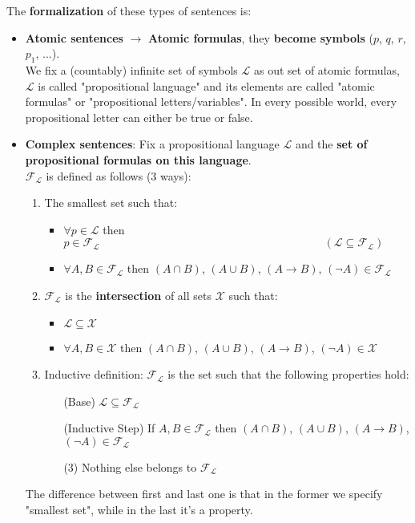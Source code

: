 	The \textbf{formalization} of these types of sentences is:
	\begin{itemize}
		\item \textbf{Atomic sentences} $\rightarrow$ \textbf{Atomic formulas}, they \textbf{become symbols} ($p$, $q$, $r$, $p_1$, ...).\\ We fix a (countably) infinite set of symbols $\mathcal{L}$ as out set of atomic formulas, $\mathcal{L}$ is called "propositional language" and its elements are called "atomic formulas" or "propositional letters/variables". In every possible world, every propositional letter can either be true or false. \\

		\item \textbf{Complex sentences}: Fix a propositional language $\mathcal{L}$ and the \textbf{set of propositional formulas on this language}.\\ $\mathcal{F}_\mathcal{L}$ is defined as follows (3 ways):
		\begin{enumerate}
			\item The smallest set such that:
			\begin{itemize}
				\item $\forall p \in \mathcal{L}$ then $p \in \mathcal{F}_\mathcal{L} \qquad\qquad\qquad\qquad\qquad\qquad\qquad\qquad\qquad\qquad (\mathcal{L} \subseteq \mathcal{F}_\mathcal{L})$
				\item $\forall A, B \in \mathcal{F}_\mathcal{L}$ then $(A \cap B)$, $(A \cup B)$, $(A \rightarrow B)$, $(\neg A) \in \mathcal{F}_\mathcal{L}$
			\end{itemize}

			\item $\mathcal{F}_\mathcal{L}$ is the \textbf{intersection} of all sets $\mathcal{X}$ such that:
			\begin{itemize}
				\item $\mathcal{L} \subseteq \mathcal{X}$
				\item $\forall A,B \in \mathcal{X}$ then $(A \cap B)$, $(A \cup B)$, $(A \rightarrow B)$, $(\neg A) \in \mathcal{X}$
			\end{itemize}

			\item Inductive definition: $\mathcal{F}_\mathcal{L}$ is the set such that the following properties hold:
			\begin{enumerate}[leftmargin=6em]
				\item[(Base)] $\mathcal{L} \subseteq \mathcal{F}_\mathcal{L}$
				\item[(Inductive Step)] If $A, B \in \mathcal{F}_\mathcal{L}$ then $(A \cap B)$, $(A \cup B)$, $(A \rightarrow B)$, $(\neg A) \in \mathcal{F}_\mathcal{L}$
				\item[(3)] Nothing else belongs to $\mathcal{F}_\mathcal{L}$
			\end{enumerate}
		\end{enumerate}

		The difference between first and last one is that in the former we specify "smallest set", while in the last it's a property.\\
	\end{itemize}

